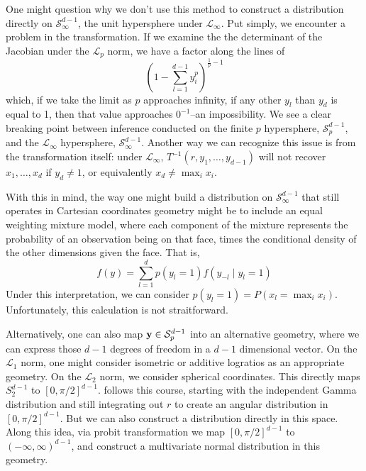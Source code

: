 One might question why we don't use this method to construct a distribution directly on
  $\mathcal{S}_{\infty}^{d-1}$, the unit hypersphere under $\mathcal{L}_{\infty}$.  Put simply, we
  encounter a problem in the transformation.  If we examine the the determinant of the Jacobian
  under the $\mathcal{L}_{p}$ norm, we have a factor along the lines of
  \begin{equation*}
    \left(1 - \sum_{l = 1}^{d-1}y_i^p\right)^{\frac{1}{p} - 1}
  \end{equation*}
  which, if we take the limit as $p$ approaches infinity, if any other $y_l$ than $y_d$ is equal to
  1, then that value approaches $0^{-1}$--an impossibility.  We see a clear breaking point
  between inference conducted on the finite $p$ hypersphere, $\mathcal{S}_{p}^{d-1}$, and the
  $\mathcal{L}_{\infty}$ hypersphere, $\mathcal{S}_{\infty}^{d-1}$. Another way we can recognize
  this issue is from the transformation itself: under $\mathcal{L}_{\infty}$,
  $T^{-1}(r,y_1,\ldots,y_{d-1})$ will not recover $x_1,\ldots,x_d$ if $y_d \neq 1$, or equivalently
  $x_d \neq \max_i x_i$.

With this in mind, the way one might build a distribution on $\mathcal{S}_{\infty}^{d-1}$ that still operates
  in Cartesian coordinates geometry might be to include an equal weighting mixture model, where each
  component of the mixture represents the probability of an observation being on that face, times
  the conditional density of the other dimensions given the face.  That is,
  \begin{equation*}
    f(y) = \sum_{l = 1}^{d}p(y_l = 1)f(y_{-l}\mid y_l = 1)
  \end{equation*}
  Under this interpretation, we can consider $p(y_l = 1) = P(x_l = \max_i x_i)$.  Unfortunately,
  this calculation is not straitforward.


Alternatively, one can also map ${\bf y}\in \mathcal{S}_{p}^{d-1}$ into an alternative geometry,
  where we can express those $d-1$ degrees of freedom in a $d-1$ dimensional vector.  On the
  $\mathcal{L}_1$ norm, one might consider isometric or additive logratios\cite{aitchison1982} as
  an appropriate geometry.  On the $\mathcal{L}_2$ norm, we consider spherical coordinates.  This
  directly maps $S_2^{d-1}$ to $[0,\pi/2]^{d-1}$. \cite{nunez2019} follows this course, starting
  with the independent Gamma distribution and still integrating out $r$ to create an angular
  distribution in $[0,\pi/2]^{d-1}$. But we can also construct a distribution directly in this
  space.  Along this idea, via probit transformation we map $[0,\pi/2]^{d-1}$ to
  $(-\infty, \infty)^{d-1}$, and construct a multivariate normal distribution in this geometry.





